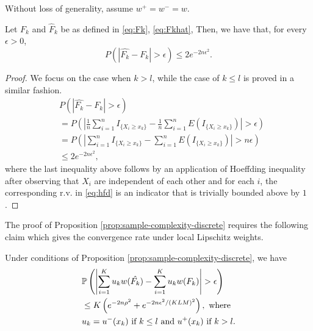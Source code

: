 
Without loss of generality, assume $w^+=w^-=w$.

\begin{proposition}
\label{prop:hoeffding-discrete}
Let $F_k$ and $\hat F_k$ be as defined in \eqref{eq:Fk}, \eqref{eq:Fkhat}, Then, we have that, for every $\epsilon >0$, 
$$P(|\hat{F_k}-F_k| > \epsilon) \leq 2 e^{-2n \epsilon^2}.$$
\end{proposition}
\begin{proof}
We focus on the case when $k > l$, while the case of $k \leq l$ is proved in a similar fashion.
\begin{align}
&P(\left|\hat{F_k}- F_k \right| > \epsilon)  \nonumber\\
&= P(\left| \frac{1}{n} \sum_{i=1}^n I_{\{X_i \geq x_k\}} - \frac{1}{n} \sum_{i=1}^n E(I_{\{X_i \geq x_k\}}) \right| > \epsilon) \nonumber\\ 
& = P(\left|\sum_{i=1}^n I_{\{X_i \geq x_k\}} - \sum_{i=1}^n E(I_{\{X_i \geq x_k\}}) \right| > n\epsilon) \label{eq:hfd} \\ 
& \leq 2e^{-2n \epsilon^2},
\end{align}
where the last inequality above follows by an application of Hoeffding inequality after observing that $X_i$ are independent of each other and for each $i$, the corresponding r.v. in \eqref{eq:hfd} is an indicator that is trivially bounded above by $1$.
\end{proof}
The proof of Proposition \ref{prop:sample-complexity-discrete} requires the following claim which gives the convergence rate under local Lipschitz weights. 
\begin{proposition}
\label{prop:discrete-first-term}
Under conditions of Proposition \ref{prop:sample-complexity-discrete}, we have
\begin{align}
&\mathbb{P}\left( \left| \sum_{i=1}^K u_{k} w(\hat{F_k}) - \sum_{i=1}^K u_{k} w(F_k) \right| >\epsilon \right)\nonumber\\
& \le K\left(
e^{-2n\rho^2} + e^{-2n\epsilon^2 /(KLM)^2}\right), \text{ where }\nonumber\\
&u_k = 
   u^{-}(x_{k})  \text{ if   } k \leq l \text{ and } 
   u^{+}(x_{k})  \text{ if  }  k > l.
 \label{eq:uplusminusxk}
\end{align} 
\end{proposition}

